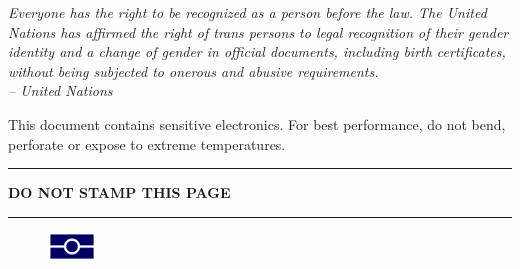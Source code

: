 \newpage
{}
\begin{center}
\color{Blue}

{\it\footnotesize
Everyone has the right to be recognized as a person before the law. The United Nations has affirmed the right of trans persons to legal recognition of their gender identity and a change of gender in official documents, including birth certificates, without being subjected to onerous and abusive requirements.\\
-- United Nations
}

\vspace{0.3in}

This document contains sensitive electronics. For best performance, do not bend, perforate or expose to extreme temperatures.\\
\vspace{0.3in}
\hrule
\vspace{0.1in}
\bf DO NOT STAMP THIS PAGE
\vspace{0.1in}
\hrule
\vspace{0.3in}
\begin{figure}[h]
    \centering
    \includegraphics[width=0.5in]{images/epassport_dark.png}
\end{figure}
\end{center}
\restoregeometry